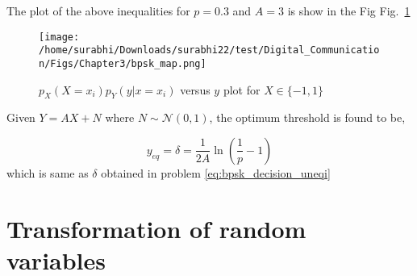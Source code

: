 \documentclass[journal,10pt,twocolumn]{IEEEtran}
\newcounter{Chapcounter}
\numberwithin{equation}{subsection}
\numberwithin{figure}{subsection}
\renewcommand\thesection{\theChapcounter.\arabic{section}}
\newcommand\figref{Fig.~\ref}
\providecommand{\gauss}[2]{\mathcal{N}\ensuremath{\left(#1,#2\right)}}
\renewcommand\thesection{\arabic{section}}
\renewcommand\thesubsection{\thesection.\arabic{subsection}}
\begin{document}
\begin{enumerate}[label=\thesubsection.\arabic*,ref=\thesubsection.\arabic{figure}]
The plot of the above inequalities for $p = 0.3$ and $A = 3$ is show in the Fig \figref{fig:bpsk_map_density} 
\begin{figure}[!ht]
\centering
\texttt{[image: /home/surabhi/Downloads/surabhi22/test/Digital\_Communication/Figs/Chapter3/bpsk\_map.png]}
\caption{$p_X(X=x_i)p_Y(y|x=x_i)$ versus $y$ plot for $X \in \{-1,1\}$}
\label{fig:bpsk_map_density}
\end{figure}

Given $Y=AX+N$ where $N \sim \gauss{0}{1}$, the optimum threshold is found to be,

\begin{equation}
	y_{eq} = \delta = \frac{1}{2A}\ln\left(\frac{1}{p}-1\right)
\end{equation}
which is same as $\delta$ obtained in problem \ref{eq:bpsk_decision_uneqi}

\end{enumerate}

\section{Transformation of random variables}	
\end{document}

